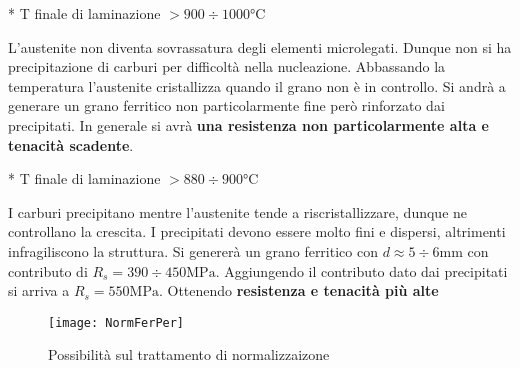 \setlength{\columnsep}{35pt}
\begin{multicols}{2}
\begin{definition}{}{*}
T finale di laminazione $> 900 \div 1000\unit{\celsius}$
\end{definition}
L'austenite non diventa sovrassatura degli elementi microlegati.
Dunque non si ha precipitazione di carburi per difficoltà nella
nucleazione. Abbassando la temperatura l'austenite cristallizza quando
il grano non è in controllo. Si andrà a generare un grano ferritico non 
particolarmente fine però rinforzato dai precipitati.
In generale si avrà \textbf{una resistenza non particolarmente alta e
tenacità scadente}.
\columnbreak
\begin{definition}{}{*}
T finale di laminazione $> 880 \div 900\unit{\celsius}$
\end{definition}
I carburi precipitano mentre l'austenite tende a riscristallizzare, dunque
ne controllano la crescita.
I precipitati devono essere molto fini e dispersi, altrimenti 
infragiliscono la struttura.
Si genererà un grano ferritico con $d \approx 5 \div 6\unit{\mm}$ con 
contributo di $R_s = 390\div450\unit{\MPa}$.
Aggiungendo il contributo dato dai precipitati si arriva a $R_s = 
550\unit{\MPa}$. Ottenendo \textbf{resistenza e tenacità più alte}
\end{multicols}

\begin{figure}
\centering
\texttt{[image: NormFerPer]}
\caption{Possibilità sul trattamento di normalizzaizone}
\label{fig:NormFerPer}
\end{figure}